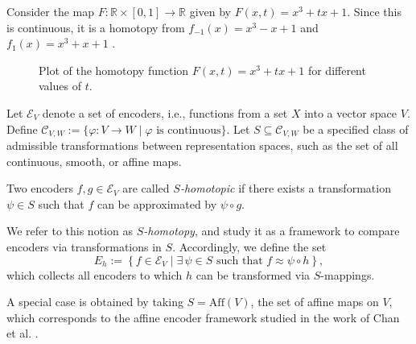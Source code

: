 Consider the map  $F : \mathbb{R} \times [0, 1] \to \mathbb{R} $
given by 
$ F(x, t) = x^3 + tx + 1. $
Since this is continuous, it is a homotopy from 
$ f_{-1}(x) = x^3 - x + 1 $
and
$ f_1(x) = x^3 + x + 1$ \cite{knudson_algtop}.
\begin{center}
    \begin{figure}[H]
        \centering
        \caption{Plot of the homotopy function $F(x,t) = x^3 + tx + 1$ for different values of $t$.}
        \label{fig:homotopy_plot}
    \end{figure}
\end{center}

Let \( \mathcal{E}_V \) denote a set of encoders, i.e., functions from a set \( X \) into a vector space \( V \).  
Define \( \mathcal{C}_{V,W} := \{ \varphi \colon V \to W \mid \varphi \text{ is continuous} \} \).  
Let \( S \subseteq \mathcal{C}_{V,W} \) be a specified class of admissible transformations between representation spaces, such as the set of all continuous, smooth, or affine maps.



Two encoders \( f, g \in \mathcal{E}_V \) are called \emph{\(S\)-homotopic} if there exists a transformation \( \psi \in S\) such that \( f \) can be approximated by \( \psi \circ g \).

We refer to this notion as \emph{\(S\)-homotopy}, and study it as a framework to compare encoders via transformations in \(S\).  
Accordingly, we define the set
\[
E_h := \left\{ f \in \mathcal{E}_V \mid \exists\, \psi \in S\text{ such that } f \approx \psi \circ h \right\},
\]
which collects all encoders to which \( h \) can be transformed via \(S\)-mappings.

A special case is obtained by taking \(S= \mathrm{Aff}(V) \), the set of affine maps on \( V \), which corresponds to the affine encoder framework studied in the work of Chan et al. \cite{chang_clust_met_space}.
